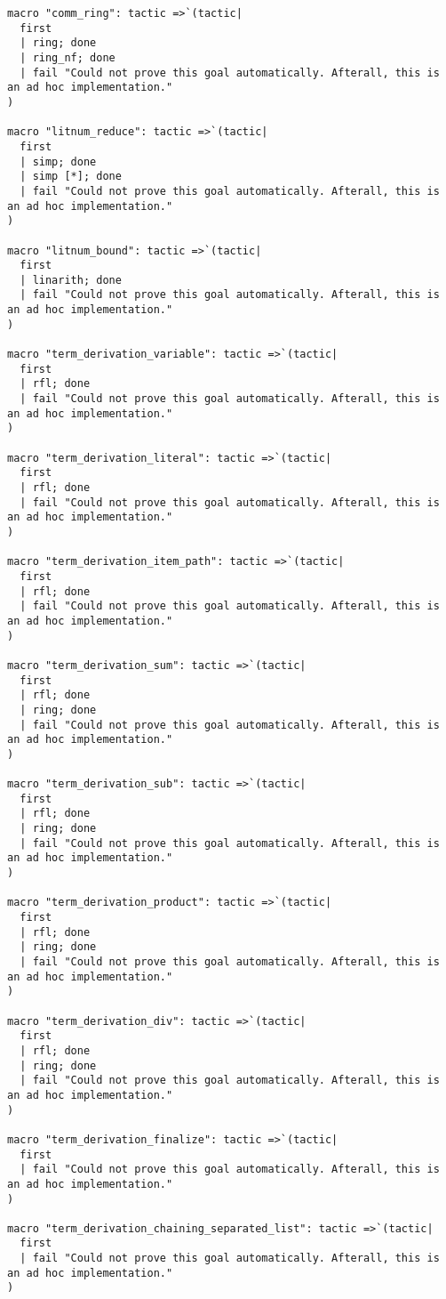 \documentclass{article}
\begin{document}
\begin{tcolorbox}[colback=white!10, width=\linewidth]
\begin{lstlisting}[language=Lean4]
macro "comm_ring": tactic =>`(tactic|
  first
  | ring; done
  | ring_nf; done
  | fail "Could not prove this goal automatically. Afterall, this is an ad hoc implementation."
)

macro "litnum_reduce": tactic =>`(tactic|
  first
  | simp; done
  | simp [*]; done
  | fail "Could not prove this goal automatically. Afterall, this is an ad hoc implementation."
)

macro "litnum_bound": tactic =>`(tactic|
  first
  | linarith; done
  | fail "Could not prove this goal automatically. Afterall, this is an ad hoc implementation."
)

macro "term_derivation_variable": tactic =>`(tactic|
  first
  | rfl; done
  | fail "Could not prove this goal automatically. Afterall, this is an ad hoc implementation."
)

macro "term_derivation_literal": tactic =>`(tactic|
  first
  | rfl; done
  | fail "Could not prove this goal automatically. Afterall, this is an ad hoc implementation."
)

macro "term_derivation_item_path": tactic =>`(tactic|
  first
  | rfl; done
  | fail "Could not prove this goal automatically. Afterall, this is an ad hoc implementation."
)

macro "term_derivation_sum": tactic =>`(tactic|
  first
  | rfl; done
  | ring; done
  | fail "Could not prove this goal automatically. Afterall, this is an ad hoc implementation."
)

macro "term_derivation_sub": tactic =>`(tactic|
  first
  | rfl; done
  | ring; done
  | fail "Could not prove this goal automatically. Afterall, this is an ad hoc implementation."
)

macro "term_derivation_product": tactic =>`(tactic|
  first
  | rfl; done
  | ring; done
  | fail "Could not prove this goal automatically. Afterall, this is an ad hoc implementation."
)

macro "term_derivation_div": tactic =>`(tactic|
  first
  | rfl; done
  | ring; done
  | fail "Could not prove this goal automatically. Afterall, this is an ad hoc implementation."
)

macro "term_derivation_finalize": tactic =>`(tactic|
  first
  | fail "Could not prove this goal automatically. Afterall, this is an ad hoc implementation."
)

macro "term_derivation_chaining_separated_list": tactic =>`(tactic|
  first
  | fail "Could not prove this goal automatically. Afterall, this is an ad hoc implementation."
)


\end{lstlisting}
\end{tcolorbox}
\end{document}
